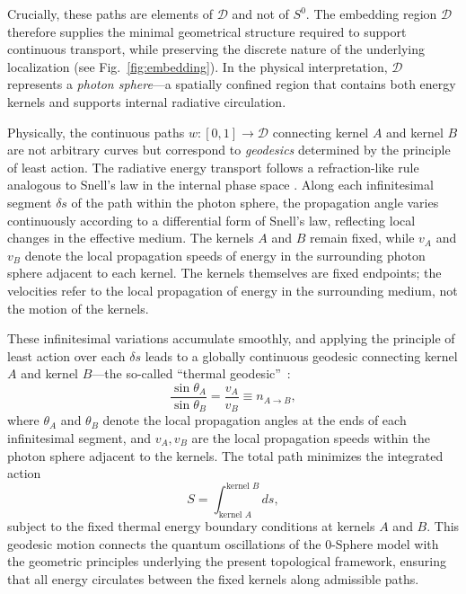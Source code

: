 \documentclass[%
 reprint,
 amsmath,amssymb,
 aps,
 prb,
]{revtex4-2}
\numberwithin{equation}{section}
\begin{document}
Crucially, these paths are elements of $\mathcal{D}$ and not of $S^{0}$.
The embedding region $\mathcal{D}$ therefore supplies the minimal geometrical structure required to support continuous transport, while preserving the discrete nature of the underlying localization (see Fig.~\ref{fig:embedding}).
In the physical interpretation, $\mathcal{D}$ represents a \textit{photon sphere}—a spatially confined region that contains both energy kernels and supports internal radiative circulation.

Physically, the continuous paths $w : [0,1] \rightarrow \mathcal{D}$ connecting kernel $A$ and kernel $B$ are not arbitrary curves but correspond to \textit{geodesics} determined by the principle of least action.
The radiative energy transport follows a refraction-like rule analogous to Snell's law in the internal phase space \cite{hanamura17765336}.
Along each infinitesimal segment $\delta s$ of the path within the photon sphere, the propagation angle varies continuously according to a differential form of Snell's law, reflecting local changes in the effective medium.
The kernels $A$ and $B$ remain fixed, while $v_A$ and $v_B$ denote the local propagation speeds of energy in the surrounding photon sphere adjacent to each kernel. The kernels themselves are fixed endpoints; the velocities refer to the local propagation of energy in the surrounding medium, not the motion of the kernels.

These infinitesimal variations accumulate smoothly, and applying the principle of least action over each $\delta s$ leads to a globally continuous geodesic connecting kernel $A$ and kernel $B$—the so-called ``thermal geodesic''~\cite{hanamura17765349}:
\begin{equation}
\frac{\sin \theta_A}{\sin \theta_B} = \frac{v_A}{v_B} \equiv n_{A \to B},
\end{equation}
where $\theta_A$ and $\theta_B$ denote the local propagation angles at the ends of each infinitesimal segment, and $v_A, v_B$ are the local propagation speeds within the photon sphere adjacent to the kernels.
The total path minimizes the integrated action
\begin{equation}
S = \int_{\text{kernel }A}^{\text{kernel }B} ds,
\end{equation}
subject to the fixed thermal energy boundary conditions at kernels $A$ and $B$.
This geodesic motion connects the quantum oscillations of the 0-Sphere model with the geometric principles underlying the present topological framework, ensuring that all energy circulates between the fixed kernels along admissible paths.
\end{document}
